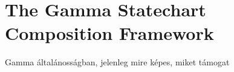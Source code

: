 \section{The Gamma Statechart Composition Framework}


Gamma általánosságban, jelenleg mire képes, miket támogat
